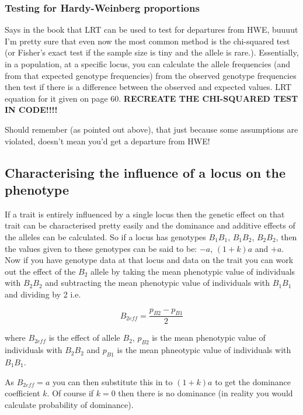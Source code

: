 \documentclass[
]{article}
\begin{document}
\hypertarget{testing-for-hardy-weinberg-proportions}{%
\subsubsection{Testing for Hardy-Weinberg
proportions}\label{testing-for-hardy-weinberg-proportions}}

Says in the book that LRT can be used to test for departures from HWE,
buuuut I'm pretty sure that even now the most common method is the
chi-squared test (or Fisher's exact test if the sample size is tiny and
the allele is rare.). Essentially, in a population, at a specific locus,
you can calculate the allele frequencies (and from that expected
genotype frequencies) from the observed genotype frequencies then test
if there is a difference between the observed and expected values. LRT
equation for it given on page 60. \textbf{RECREATE THE CHI-SQUARED TEST
IN CODE!!!!}

Should remember (as pointed out above), that just because some
assumptions are violated, doesn't mean you'd get a departure from HWE!

\hypertarget{characterising-the-influence-of-a-locus-on-the-phenotype}{%
\subsection{Characterising the influence of a locus on the
phenotype}\label{characterising-the-influence-of-a-locus-on-the-phenotype}}

If a trait is entirely influenced by a single locus then the genetic
effect on that trait can be characterised pretty easily and the
dominance and additive effects of the alleles can be calculated. So if a
locus has genotypes \(B_1B_1\), \(B_1B_2\), \(B_2B_2\), then the values
given to these genotypes can be said to be: \(-a\), \((1 + k)a\) and
\(+a\). Now if you have genotype data at that locus and data on the
trait you can work out the effect of the \(B_2\) allele by taking the
mean phenotypic value of individuals with \(B_2B_2\) and subtracting the
mean phenotypic value of individuals with \(B_1B_1\) and dividing by 2
i.e.

\[ B_{2eff} = \frac{p_{B2} - p_{B1}} {2} \]

where \(B_{2eff}\) is the effect of allele \(B_2\), \(p_{B2}\) is the
mean phenotypic value of individuals with \(B_2B_2\) and \(p_{B1}\) is
the mean phneotypic value of individuals with \(B_1B_1\).

As \(B_{2eff} = a\) you can then substitute this in to \((1 + k)a\) to
get the dominance coefficient \(k\). Of course if \(k = 0\) then there
is no dominance (in reality you would calculate probability of
dominance).
\end{document}
